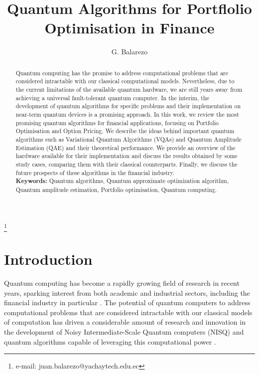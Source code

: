 \documentclass[prx,twocolumn,floatfix,superscriptaddress,longbibliography]{revtex4-1}
\begin{document}
\title{Quantum Algorithms for Portflolio Optimisation in Finance}

\author{G. Balarezo}
\thanks{e-mail: juan.balarezo@yachaytech.edu.ec}


\begin{abstract}
Quantum computing has the promise to address computational problems that are considered intractable with our classical computational models. Nevertheless, due to the current limitations of the available quantum hardware, we are still years away from achieving a universal fault-tolerant quantum computer. In the interim, the development of quantum algorithms for specific problems and their implementation on near-term quantum devices is a promising approach. In this work, we review the most promising quantum algorithms for financial applications, focusing on Portfolio Optimisation and Option Pricing. We describe the ideas behind important quantum algorithms such as Variational Quantum Algorithms (VQAs) and Quantum Amplitude Estimation (QAE) and their theoretical performance. We provide an overview of the hardware available for their implementation and discuss the results 
obtained by some study cases, comparing them with their classical counterparts. Finally, we discuss the future prospects of these algorithms in the financial industry.
  \\
  \textbf{Keywords:} Quantum algorithms, Quantum approximate optimization algorithm, Quantum amplitude estimation, Portfolio optimisation, Quantum computing.
\end{abstract}

\maketitle

\section{Introduction}

Quantum computing has become a rapidly growing field of research in recent years, sparking interest from both academic and industrial sectors, including the financial industry in particular \cite{Hassija2020}. The potential of quantum computers to address computational problems that are considered intractable with our classical models of computation \cite{nielsen2010quantum} has driven a considerable amount of research and innovation in the development of Noisy Intermediate-Scale Quantum computers (NISQ) and quantum algorithms capable of leveraging this computational power \cite{Huang2023}. 
\end{document}
